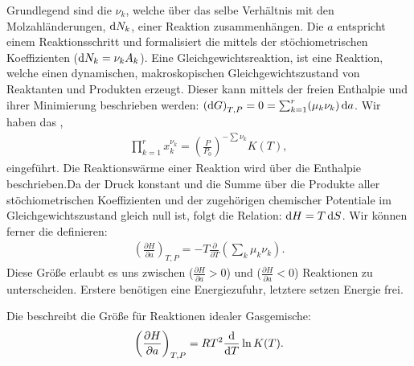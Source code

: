 \begin{summary}
     Grundlegend sind die  $\nu_k$, welche über das selbe Verhältnis mit den Molzahländerungen, $\mathop{}\!\mathrm{d} N_k$, einer Reaktion zusammenhängen. Die  $a$ entspricht einem Reaktionsschritt und formalisiert die  mittels der stöchiometrischen Koeffizienten ($\mathop{}\!\mathrm{d} N_k=\nu_k A_k$). 
    Eine Gleichgewichtsreaktion, ist eine Reaktion, welche einen dynamischen, makroskopischen Gleichgewichtszustand von Reaktanten und Produkten erzeugt. Dieser kann mittels der freien Enthalpie und ihrer Minimierung beschrieben werden: $\left(\mathop{}\!\mathrm{d} G\right)_{T,P}=0=\sum_{k=1}^{r}(\mu_k\nu_k)\mathop{}\!\mathrm{d} a$.
    Wir haben das ,
    \begin{align*}
        \prod_{k=1}^{r}x_k^{\nu_k}=\left(\frac{P}{P_0}\right)^{-\sum\nu_k}K(T),
    \end{align*}
    eingeführt.
    Die Reaktionswärme einer Reaktion wird über die Enthalpie beschrieben.Da der Druck konstant und die Summe über die Produkte aller stöchiometrischen Koeffizienten und der zugehörigen chemischer Potentiale im Gleichgewichtszustand gleich null ist, folgt die Relation: $\mathop{}\!\mathrm{d} H=T\mathop{}\!\mathrm{d} S$. Wir können ferner die  definieren:
    \begin{align*}
        \left(\frac{\partial H}{\partial a}\right)_{T,P}=-T\frac{\partial}{\partial T}\left(\sum_{k}\mu_k\nu_k\right).
    \end{align*}
    Diese Größe erlaubt es uns zwischen  ($\frac{\partial H}{\partial a}>0$) und  ($\frac{\partial H}{\partial a}<0$) Reaktionen zu unterscheiden. Erstere benötigen eine Energiezufuhr, letztere setzen Energie frei.

    Die  beschreibt die Größe für Reaktionen idealer Gasgemische:
    \begin{align*}
        \left(\frac{\partial H}{\partial a}\right)_{T,P}=RT^2\frac{\mathop{}\!\mathrm{d}}{\mathop{}\!\mathrm{d} T}\ln K(T).
    \end{align*}
\end{summary}